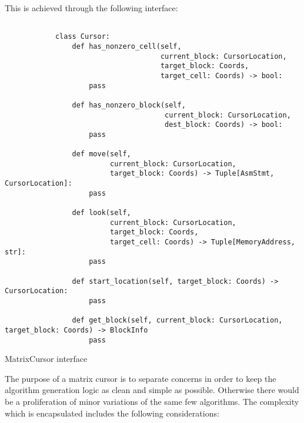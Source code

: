     This is achieved through the following interface:
    \begin{listing}
        \begin{verbatim}

            class Cursor:
                def has_nonzero_cell(self, 
                                     current_block: CursorLocation, 
                                     target_block: Coords, 
                                     target_cell: Coords) -> bool:
                    pass

                def has_nonzero_block(self, 
                                      current_block: CursorLocation, 
                                      dest_block: Coords) -> bool:
                    pass

                def move(self, 
                         current_block: CursorLocation, 
                         target_block: Coords) -> Tuple[AsmStmt, CursorLocation]:
                    pass

                def look(self, 
                         current_block: CursorLocation, 
                         target_block: Coords, 
                         target_cell: Coords) -> Tuple[MemoryAddress, str]:
                    pass

                def start_location(self, target_block: Coords) -> CursorLocation:
                    pass

                def get_block(self, current_block: CursorLocation, target_block: Coords) -> BlockInfo
                    pass
        \end{verbatim}
        \caption{MatrixCursor interface}
        \label{lst:matrixcursor_interface}
    \end{listing}

    The purpose of a matrix cursor is to separate concerns in order to keep the algorithm generation logic as clean and simple as possible. Otherwise there would be a proliferation of minor variations of the same few algorithms. The complexity which is encapsulated includes the following considerations:


